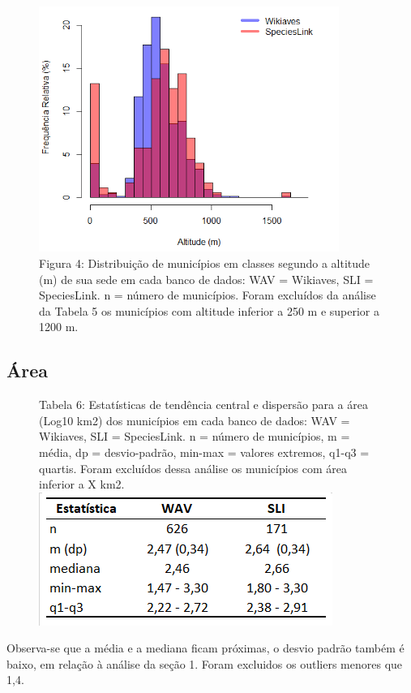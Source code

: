 \begin{figure}[h!]
\centering
\includegraphics[height = 8cm]{Imagens/H04.png}
\\{\scriptsize Figura 4: Distribuição de municípios em classes segundo a altitude (m) de sua sede em cada banco de dados: WAV = Wikiaves, SLI = SpeciesLink. n = número de municípios. Foram excluídos da análise da Tabela 5 os municípios com altitude inferior a 250 m e superior a 1200 m.}
\end{figure}

\newpage

\subsection{Área}

\begin{figure}[h!]
\centering
{\scriptsize Tabela 6: Estatísticas de tendência central e dispersão para a área (Log10 km2) dos municípios em cada banco de dados: WAV = Wikiaves, SLI = SpeciesLink. n = número de municípios, m = média, dp = desvio-padrão, min-max = valores extremos, q1-q3 = quartis. Foram excluídos dessa análise os municípios com área inferior a X km2.}
\includegraphics{Imagens/T06.png}
\end{figure}

\begin{resposta}
Observa-se que a média e a mediana ficam próximas, o desvio padrão também é baixo, em relação à análise da seção 1. Foram excluidos os outliers menores que 1,4.
\end{resposta}



